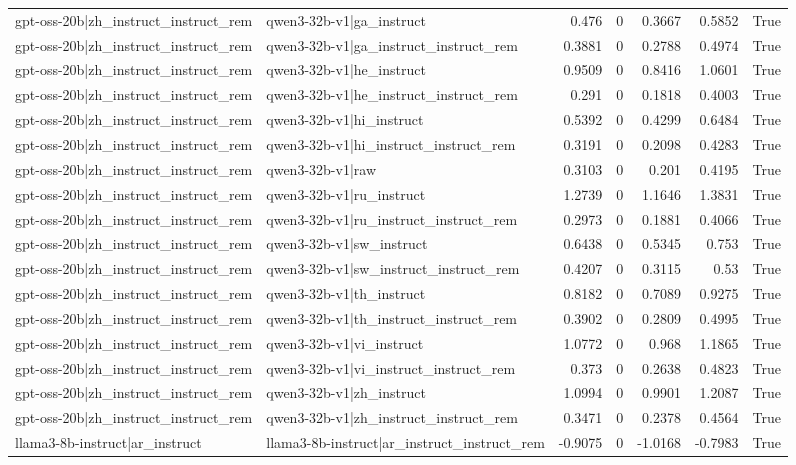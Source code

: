 \begin{table}
\begin{tabular}{l l r r r r l}
gpt-oss-20b|zh_instruct_instruct_rem & qwen3-32b-v1|ga_instruct & 0.476 & 0 & 0.3667 & 0.5852 & True \\
gpt-oss-20b|zh_instruct_instruct_rem & qwen3-32b-v1|ga_instruct_instruct_rem & 0.3881 & 0 & 0.2788 & 0.4974 & True \\
gpt-oss-20b|zh_instruct_instruct_rem & qwen3-32b-v1|he_instruct & 0.9509 & 0 & 0.8416 & 1.0601 & True \\
gpt-oss-20b|zh_instruct_instruct_rem & qwen3-32b-v1|he_instruct_instruct_rem & 0.291 & 0 & 0.1818 & 0.4003 & True \\
gpt-oss-20b|zh_instruct_instruct_rem & qwen3-32b-v1|hi_instruct & 0.5392 & 0 & 0.4299 & 0.6484 & True \\
gpt-oss-20b|zh_instruct_instruct_rem & qwen3-32b-v1|hi_instruct_instruct_rem & 0.3191 & 0 & 0.2098 & 0.4283 & True \\
gpt-oss-20b|zh_instruct_instruct_rem & qwen3-32b-v1|raw & 0.3103 & 0 & 0.201 & 0.4195 & True \\
gpt-oss-20b|zh_instruct_instruct_rem & qwen3-32b-v1|ru_instruct & 1.2739 & 0 & 1.1646 & 1.3831 & True \\
gpt-oss-20b|zh_instruct_instruct_rem & qwen3-32b-v1|ru_instruct_instruct_rem & 0.2973 & 0 & 0.1881 & 0.4066 & True \\
gpt-oss-20b|zh_instruct_instruct_rem & qwen3-32b-v1|sw_instruct & 0.6438 & 0 & 0.5345 & 0.753 & True \\
gpt-oss-20b|zh_instruct_instruct_rem & qwen3-32b-v1|sw_instruct_instruct_rem & 0.4207 & 0 & 0.3115 & 0.53 & True \\
gpt-oss-20b|zh_instruct_instruct_rem & qwen3-32b-v1|th_instruct & 0.8182 & 0 & 0.7089 & 0.9275 & True \\
gpt-oss-20b|zh_instruct_instruct_rem & qwen3-32b-v1|th_instruct_instruct_rem & 0.3902 & 0 & 0.2809 & 0.4995 & True \\
gpt-oss-20b|zh_instruct_instruct_rem & qwen3-32b-v1|vi_instruct & 1.0772 & 0 & 0.968 & 1.1865 & True \\
gpt-oss-20b|zh_instruct_instruct_rem & qwen3-32b-v1|vi_instruct_instruct_rem & 0.373 & 0 & 0.2638 & 0.4823 & True \\
gpt-oss-20b|zh_instruct_instruct_rem & qwen3-32b-v1|zh_instruct & 1.0994 & 0 & 0.9901 & 1.2087 & True \\
gpt-oss-20b|zh_instruct_instruct_rem & qwen3-32b-v1|zh_instruct_instruct_rem & 0.3471 & 0 & 0.2378 & 0.4564 & True \\
llama3-8b-instruct|ar_instruct & llama3-8b-instruct|ar_instruct_instruct_rem & -0.9075 & 0 & -1.0168 & -0.7983 & True \\

\end{tabular}
\end{table}
